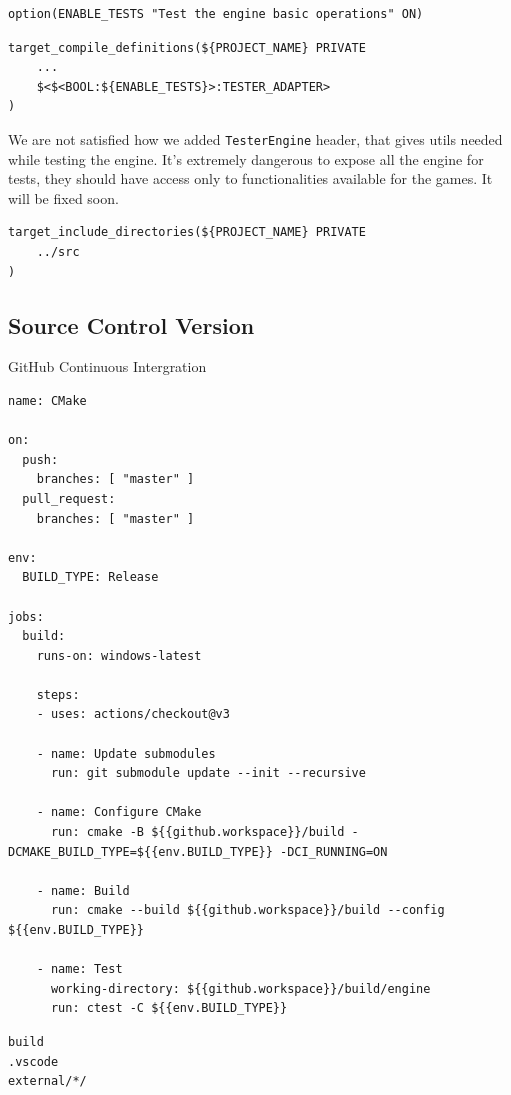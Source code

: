 \begin{lstlisting}[caption=Enabling Tests(./CMakeLists.txt)]
option(ENABLE_TESTS "Test the engine basic operations" ON)
\end{lstlisting}

\begin{lstlisting}[caption=\texttt{TESTER\_ADAPTER} preprocessor declaration(./engine/CMakeLists.txt and ./engine/tests/CMakeLists.txt)]
target_compile_definitions(${PROJECT_NAME} PRIVATE
    ...
    $<$<BOOL:${ENABLE_TESTS}>:TESTER_ADAPTER>
)
\end{lstlisting}

We are not satisfied how we added \texttt{TesterEngine} header, that gives utils needed while testing the engine. It's extremely dangerous to expose all the engine for tests, they should have access only to functionalities available for the games. It will be fixed soon. 
\begin{lstlisting}[caption=Including common internal utils (./engine/tests/CMakeLists.txt)]
target_include_directories(${PROJECT_NAME} PRIVATE
    ../src
)
\end{lstlisting}

\subsection{Source Control Version}
\label{sec:scv}
GitHub Continuous Intergration
\label{lst:cicmake}
\begin{lstlisting}[caption=Continuous intergration's build test (./.github/workflows/.cmake.yml)]
name: CMake

on:
  push:
    branches: [ "master" ]
  pull_request:
    branches: [ "master" ]

env:
  BUILD_TYPE: Release

jobs:
  build:
    runs-on: windows-latest

    steps:
    - uses: actions/checkout@v3

    - name: Update submodules
      run: git submodule update --init --recursive

    - name: Configure CMake
      run: cmake -B ${{github.workspace}}/build -DCMAKE_BUILD_TYPE=${{env.BUILD_TYPE}} -DCI_RUNNING=ON

    - name: Build
      run: cmake --build ${{github.workspace}}/build --config ${{env.BUILD_TYPE}}

    - name: Test
      working-directory: ${{github.workspace}}/build/engine
      run: ctest -C ${{env.BUILD_TYPE}}
\end{lstlisting}

\begin{lstlisting}[caption=\texttt{.gitignore} (./.gitignore)]
build
.vscode
external/*/
\end{lstlisting}